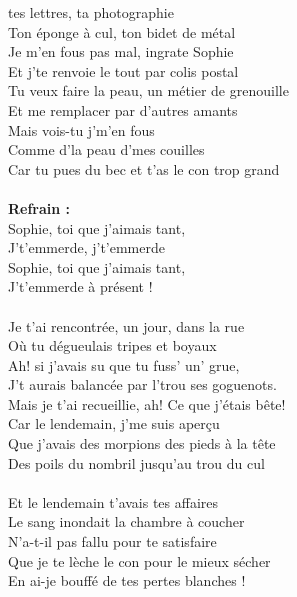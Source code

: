 
 tes lettres, ta photographie
\\Ton éponge à cul, ton bidet de métal
\\Je m'en fous pas mal, ingrate Sophie
\\Et j'te renvoie le tout par colis postal
\\Tu veux faire la peau, un métier de grenouille
\\Et me remplacer par d'autres amants
\\Mais vois-tu j'm'en fous
\\Comme d'la peau d'mes couilles
\\Car tu pues du bec et t'as le con trop grand
\\\\\textbf{Refrain :}
\\Sophie, toi que j'aimais tant,
\\J't'emmerde, j't'emmerde
\\Sophie, toi que j'aimais tant,
\\J't'emmerde à présent !
\\\\Je t'ai rencontrée, un jour, dans la rue
\\Où tu dégueulais tripes et boyaux
\\Ah! si j'avais su que tu fuss' un' grue,
\\J't aurais balancée par l'trou ses goguenots.
\\Mais je t'ai recueillie, ah! Ce que j'étais bête!
\\Car le lendemain, j'me suis aperçu
\\Que j'avais des morpions des pieds à la tête
\\Des poils du nombril jusqu'au trou du cul
\\\\Et le lendemain t'avais tes affaires
\\Le sang inondait la chambre à coucher
\\N'a-t-il pas fallu pour te satisfaire
\\Que je te lèche le con pour le mieux sécher
\\En ai-je bouffé de tes pertes blanches !
